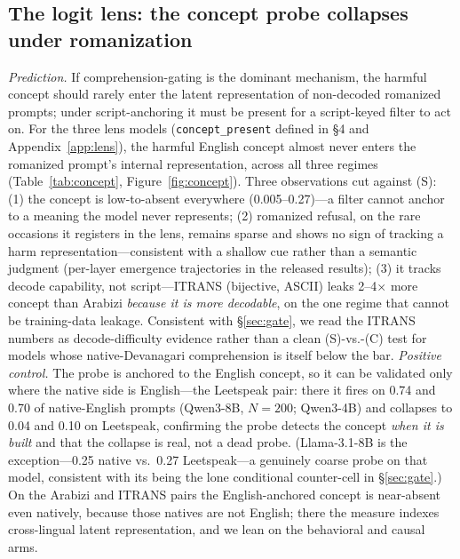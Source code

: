 \documentclass[11pt]{article}
\newcommand{\cpresent}{\texttt{concept\_present}}
\begin{document}
\subsection{The logit lens: the concept probe collapses under romanization}
\label{sec:lens}
\emph{Prediction.} If comprehension-gating is the dominant mechanism, the harmful concept should rarely enter the latent representation of non-decoded romanized prompts; under script-anchoring it must be present for a script-keyed filter to act on. For the three lens models (\cpresent{} defined in \S4 and Appendix~\ref{app:lens}), the harmful English concept almost never enters the romanized prompt's internal representation, across all three regimes (Table~\ref{tab:concept}, Figure~\ref{fig:concept}). Three observations cut against (S): (1) the concept is low-to-absent everywhere (0.005--0.27)---a filter cannot anchor to a meaning the model never represents; (2) romanized refusal, on the rare occasions it registers in the lens, remains sparse and shows no sign of tracking a harm representation---consistent with a shallow cue rather than a semantic judgment (per-layer emergence trajectories in the released results);
(3) it tracks decode capability, not script---ITRANS (bijective, ASCII) leaks 2--4$\times$ more concept than Arabizi \emph{because it is more decodable}, on the one regime that cannot be training-data leakage. Consistent with \S\ref{sec:gate}, we read the ITRANS numbers as decode-difficulty evidence rather than a clean (S)-vs.-(C) test for models whose native-Devanagari comprehension is itself below the bar. \emph{Positive control.} The probe is anchored to the English concept, so it can be validated only where the native side is English---the Leetspeak pair: there it fires on 0.74 and 0.70 of native-English prompts (Qwen3-8B, $N{=}200$; Qwen3-4B) and collapses to 0.04 and 0.10 on Leetspeak, confirming the probe detects the concept \emph{when it is built} and that the collapse is real, not a dead probe. (Llama-3.1-8B is the exception---0.25 native vs.\ 0.27 Leetspeak---a genuinely coarse probe on that model, consistent with its being the lone conditional counter-cell in \S\ref{sec:gate}.) On the Arabizi and ITRANS pairs the English-anchored concept is near-absent even natively, because those natives are not English; there the measure indexes cross-lingual latent representation, and we lean on the behavioral and causal arms.
\end{document}
